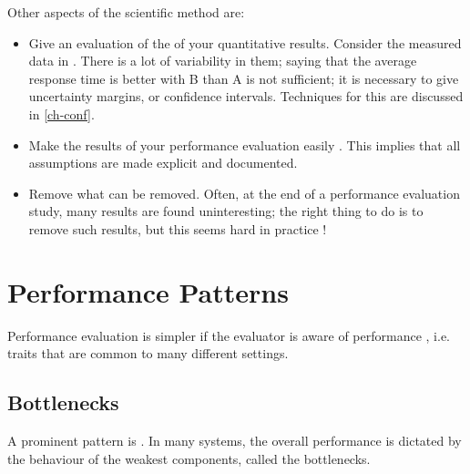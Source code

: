 Other aspects of the scientific method are:
\noitemsep
\begin{itemize}
    \item Give an evaluation of the  of your
quantitative results. Consider the measured data
in . There is a lot of
variability in them; saying that the average
response time is better with B than A is not
sufficient; it is necessary to give uncertainty
margins, or confidence intervals. Techniques for
this are discussed in \cref{ch-conf}.
    \item Make the results of your performance evaluation easily
. This implies that all
assumptions are made explicit and documented.
\item Remove what can be removed. Often, at the end of a
performance evaluation study, many results are
found uninteresting; the right thing to do is to
remove such results, but this seems hard in
practice !
\end{itemize}
\doitemsep
%
%
%
%


\section{Performance Patterns}
 Performance evaluation is
simpler if the evaluator is aware of performance
, i.e. traits that are common to
many different settings.

\subsection{Bottlenecks}
A prominent pattern is . In many
systems, the overall performance is dictated by
the behaviour of the weakest components, called
the bottlenecks.

